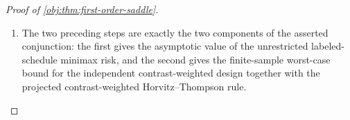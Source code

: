 \documentclass[11pt]{article}
\begin{document}
\begin{proof}[Proof of \cref{obj:thm:first-order-saddle}]
\begin{enumerate}
For every \(y\in[-L_c/2,L_c/2]\) and every real \(x\),
\[
\left\{
\operatorname{proj}_{[-L_c/2,L_c/2]}(x)-y
\right\}^2
\le
(x-y)^2.
\]
Indeed, if \(x\) lies in the interval there is equality; if \(x<-L_c/2\), then
\(0\le y+L_c/2\le y-x\); and if \(x>L_c/2\), then
\(0\le L_c/2-y\le x-y\). Squaring gives the displayed inequality in the two boundary cases. Applying it with \(y=\tau_c(z)\) shows, pointwise in the assignment,
\[
\left\{
\widehat\tau_{\mathrm{cHT}}^\star(A,Y^{\mathrm{obs}})
-\tau_c(z)
\right\}^2
\le
\left\{
\widetilde\tau_{\mathrm{raw}}(A,z)-\tau_c(z)
\right\}^2.
\]
Consequently,
\[
R_n(\mathcal D^\star,\widehat\tau_{\mathrm{cHT}}^\star;z)
\le
\frac{C_0(c)}{n}.
\]
Since \(z\) was arbitrary,
\[
\max_{z\in\mathcal T_K^n}
R_n(\mathcal D^\star,\widehat\tau_{\mathrm{cHT}}^\star;z)
\le
\frac{C_0(c)}{n}.
\]

\item The two preceding steps are exactly the two components of the asserted conjunction: the first gives the asymptotic value of the unrestricted labeled-schedule minimax risk, and the second gives the finite-sample worst-case bound for the independent contrast-weighted design together with the projected contrast-weighted Horvitz--Thompson rule. %
\end{enumerate}
\end{proof}
\end{document}
